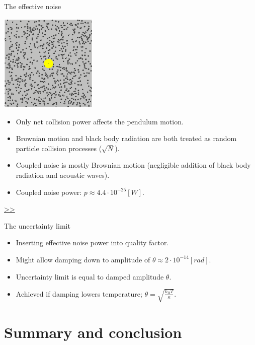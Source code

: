 \documentclass{beamer}
\begin{document}
\begin{frame}{\hypertarget{frame:The effective noise}{The effective noise}}
	\begin{center}		
		\includegraphics[width=0.35\textwidth,keepaspectratio]{random_motion1.jpg}
	\end{center}


	\begin{itemize}	
		
		\item Only net collision power affects the pendulum motion.
		\item Brownian motion and black body radiation are both treated as random particle collision processes ($\sqrt{N}$).
		\item Coupled noise is mostly Brownian motion (negligible addition of black body radiation and acoustic waves). 
		\item Coupled noise power: $p \approx 4.4\cdot 10^{-25}[W]$.  	 
					
	\end{itemize}
	\hyperlink{frame:The effective noise 1}{>>} 

\end{frame}


\begin{frame}{The uncertainty limit}
	
	\begin{itemize}
		\item Inserting effective noise power into quality factor.
		\item Might allow damping down to amplitude of $\theta\approx 2\cdot 10^{-14}[rad]$.
		\item Uncertainty limit is equal to damped amplitude $\theta$. 	
		\item Achieved if damping lowers temperature; $\theta = \sqrt{\frac{k_B T}{\kappa}}$.
				
	\end{itemize}
\end{frame}


\section{Summary and conclusion}
\end{document}

